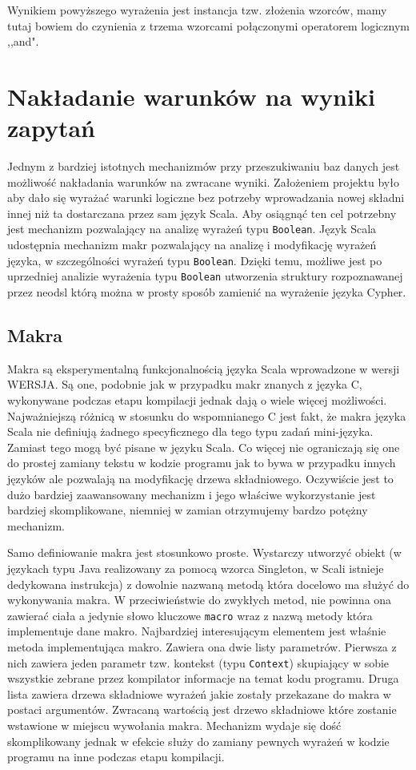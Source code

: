 \documentclass[brudnopis]{xmgr}
\begin{document}
Wynikiem powyższego wyrażenia jest instancja tzw. złożenia wzorców, mamy tutaj bowiem do czynienia z trzema wzorcami połączonymi operatorem logicznym ,,and". 

\section{Nakładanie warunków na wyniki zapytań}

Jednym z bardziej istotnych mechanizmów przy przeszukiwaniu baz danych jest możliwość nakładania warunków na zwracane wyniki. Założeniem projektu było aby dało się wyrażać warunki logiczne bez potrzeby wprowadzania nowej składni innej niż ta dostarczana przez sam język Scala. 
Aby osiągnąć ten cel potrzebny jest mechanizm pozwalający na analizę wyrażeń typu \texttt{Boolean}. Język Scala udostępnia mechanizm makr pozwalający na analizę i modyfikację wyrażeń języka, w szczególności wyrażeń typu \texttt{Boolean}. Dzięki temu, możliwe jest po uprzedniej analizie wyrażenia typu \texttt{Boolean} utworzenia struktury rozpoznawanej przez neodsl którą można w prosty sposób zamienić na wyrażenie języka Cypher.

\subsection{Makra}

Makra są eksperymentalną funkcjonalnością języka Scala wprowadzone w wersji WERSJA. Są one, podobnie jak w przypadku makr znanych z języka C, wykonywane podczas etapu kompilacji jednak dają o wiele więcej możliwości. Najważniejszą różnicą w stosunku do wspomnianego C jest fakt, że makra języka Scala nie definiują żadnego specyficznego dla tego typu zadań mini-języka. Zamiast tego mogą być pisane w języku Scala. Co więcej nie ograniczają się one do prostej zamiany tekstu w kodzie programu jak to bywa w przypadku innych języków ale pozwalają na modyfikację drzewa składniowego. Oczywiście jest to dużo bardziej zaawansowany mechanizm i jego właściwe wykorzystanie jest bardziej skomplikowane, niemniej w zamian otrzymujemy bardzo potężny mechanizm.

Samo definiowanie makra jest stosunkowo proste. Wystarczy utworzyć obiekt (w językach typu Java realizowany za pomocą wzorca Singleton, w Scali istnieje dedykowana instrukcja) z dowolnie nazwaną metodą która docelowo ma służyć do wykonywania makra. W przeciwieństwie do zwykłych metod, nie powinna ona zawierać ciała a jedynie słowo kluczowe \texttt{macro} wraz z nazwą metody która implementuje dane makro. Najbardziej interesującym elementem jest właśnie metoda implementująca makro. Zawiera ona dwie listy parametrów. Pierwsza z nich zawiera jeden parametr tzw. kontekst (typu \texttt{Context}) skupiający w sobie wszystkie zebrane przez kompilator informacje na temat kodu programu. Druga lista zawiera drzewa składniowe wyrażeń jakie zostały przekazane do makra w postaci argumentów. Zwracaną wartością jest drzewo składniowe które zostanie wstawione w miejscu wywołania makra. Mechanizm wydaje się dość skomplikowany jednak w efekcie służy do zamiany pewnych wyrażeń w kodzie programu na inne podczas etapu kompilacji.
\end{document}
